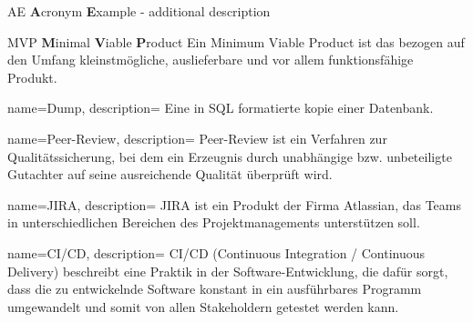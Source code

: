 %
%


\usepackage{xparse}

 {
	\makeglossaries
}





{AE}
{\textbf{A}cronym \textbf{E}xample - additional description}





{MVP}
{\textbf{M}inimal \textbf{V}iable \textbf{P}roduct}
{
	Ein Minimum Viable Product ist das bezogen auf den Umfang kleinstmögliche, auslieferbare und vor allem funktionsfähige Produkt.
}



{
	name=Dump,
	description={
		Eine in SQL formatierte kopie einer Datenbank.
	}
}


{
	name=Peer-Review,
	description={
		Peer-Review ist ein Verfahren zur Qualitätssicherung, bei dem ein Erzeugnis durch unabhängige bzw. unbeteiligte Gutachter auf seine ausreichende Qualität überprüft wird.
	}
}



{
	name=JIRA,
	description={
		JIRA ist ein Produkt der Firma Atlassian, das Teams in unterschiedlichen Bereichen des Projektmanagements unterstützen soll.
	}
}


{
	name=CI/CD,
	description={
		CI/CD (Continuous Integration / Continuous Delivery) beschreibt eine Praktik in der Software-Entwicklung, die dafür sorgt, dass die zu entwickelnde Software konstant in ein ausführbares Programm umgewandelt und somit von allen Stakeholdern getestet werden kann.
	}
}

